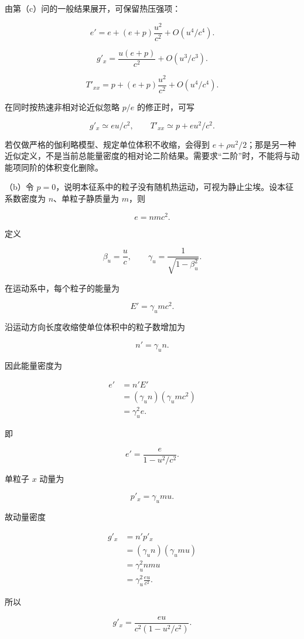 \documentclass[12pt,a4paper,UTF8]{ctexart}
\begin{document}
由第（c）问的一般结果展开，可保留热压强项：

\[\boxed{e'=e+(e+p)\frac{u^2}{c^2}+O(u^4/c^4)}.\tag{4}\]

\[\boxed{g'_x=\frac{u(e+p)}{c^2}+O(u^3/c^3)}.\tag{5}\]

\[\boxed{T'_{xx}=p+(e+p)\frac{u^2}{c^2}+O(u^4/c^4)}.\tag{6}\]

在同时按热速非相对论近似忽略 \(p/e\) 的修正时，可写

\[g'_x\simeq eu/c^2,\qquad T'_{xx}\simeq p+eu^2/c^2.\tag{7}\]

若仅做严格的伽利略模型、规定单位体积不收缩，会得到
\(e+\rho u^2/2\)；那是另一种近似定义，不是当前总能量密度的相对论二阶结果。需要求``二阶''时，不能将与动能项同阶的体积变化删除。

（b）令
\(p=0\)，说明本征系中的粒子没有随机热运动，可视为静止尘埃。设本征系数密度为
\(n\)、单粒子静质量为 \(m\)，则

\[
e=nmc^2. \tag{9}
\]

定义

\[
\beta_u=\frac uc,
\qquad
\gamma_u=\frac1{\sqrt{1-\beta_u^2}}. \tag{10}
\]

在运动系中，每个粒子的能量为

\[
E'=\gamma_umc^2. \tag{11}
\]

沿运动方向长度收缩使单位体积中的粒子数增加为

\[
n'=\gamma_un. \tag{12}
\]

因此能量密度为

\[
\begin{aligned}
e'
&=n'E'\\
&=(\gamma_un)(\gamma_umc^2)\\
&=\gamma_u^2e.
\end{aligned} \tag{13}
\]

即

\[
\boxed{
e'=\frac{e}{1-u^2/c^2}
}. \tag{14}
\]

单粒子 \(x\) 动量为

\[
p'_x=\gamma_umu. \tag{15}
\]

故动量密度

\[
\begin{aligned}
g'_x
&=n'p'_x\\
&=(\gamma_un)(\gamma_umu)\\
&=\gamma_u^2nmu\\
&=\gamma_u^2\frac{eu}{c^2}.
\end{aligned} \tag{16}
\]

所以

\[
\boxed{
g'_x=\frac{eu}{c^2(1-u^2/c^2)}
}. \tag{17}
\]
\end{document}
